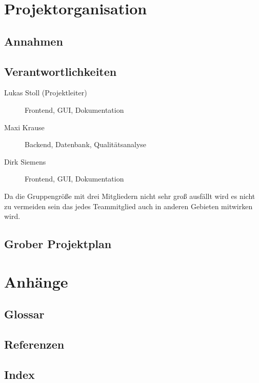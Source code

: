 \section{Projektorganisation}

	\subsection{Annahmen}
	
	\subsection{Verantwortlichkeiten}
		\begin{description}
			\item[Lukas Stoll (Projektleiter)] Frontend, GUI, Dokumentation
			\item[Maxi Krause] Backend, Datenbank, Qualitätsanalyse
			\item[Dirk Siemens] Frontend, GUI, Dokumentation
		\end{description}
		Da die Gruppengröße mit drei Mitgliedern nicht sehr groß ausfällt wird es nicht zu vermeiden sein das jedes Teammitglied auch in anderen Gebieten mitwirken wird. 
	
	\subsection{Grober Projektplan}
		
	

\section{Anhänge}

	\subsection{Glossar}
	
	\subsection{Referenzen}
	
	\subsection{Index}